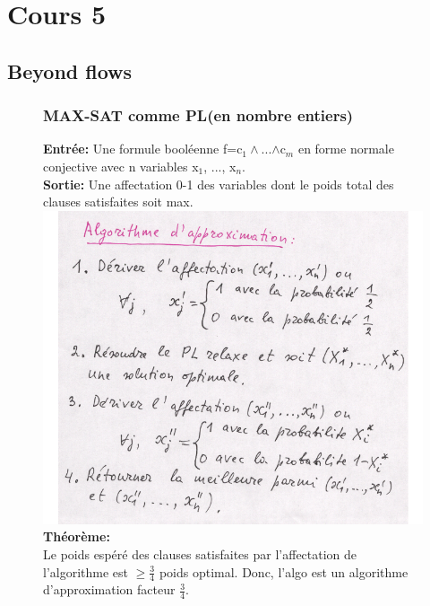 \section{Cours 5}
\subsection{Beyond flows}
\begin{figure}[!ht]
	\subsubsection{MAX-SAT comme PL(en nombre entiers)}
	\textbf{Entrée:} Une formule booléenne f=c$_1\wedge$...$\wedge$c$_m$ en forme normale conjective avec n
	variables x$_1$, ..., x$_n$.\\
	\textbf{Sortie:} Une affectation 0-1 des variables dont le poids total des clauses satisfaites soit max.\\
	\includegraphics[width=\linewidth,height=0.75\textheight]{notes/algorithme/algo_appro.png}
	\textbf{Théorème:\\}
	Le poids espéré des clauses satisfaites par l'affectation de l'algorithme est $\geq\frac{3}{4}$ poids optimal.
	Donc, l'algo est un algorithme d'approximation facteur $\frac{3}{4}$.
\end{figure}
